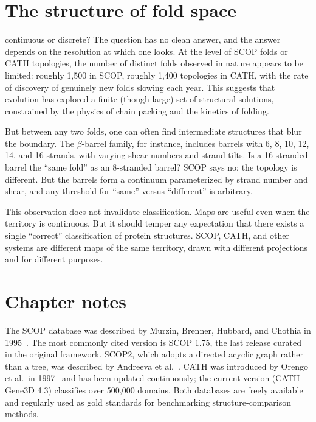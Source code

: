 \section{The structure of fold space}
\label{sec:fold_space}

 continuous or discrete? The question
has no clean answer, and the answer depends on the resolution at which one looks.
At the level of SCOP folds or CATH topologies, the number of distinct folds
observed in nature appears to be limited: roughly 1,500 in SCOP, roughly 1,400
topologies in CATH, with the rate of discovery of genuinely new folds slowing each
year. This suggests that evolution has explored a finite (though large) set of
structural solutions, constrained by the physics of chain packing and the
kinetics of folding.

But between any two folds, one can often find intermediate structures that blur
the boundary. The $\beta$-barrel family, for instance, includes barrels with 6, 8,
10, 12, 14, and 16 strands, with varying shear numbers and strand tilts. Is a
16-stranded barrel the ``same fold'' as an 8-stranded barrel? SCOP says no; the
topology is different. But the barrels form a continuum parameterized by strand
number and shear, and any threshold for ``same'' versus ``different'' is
arbitrary.

This observation does not invalidate classification. Maps are useful even when
the territory is continuous. But it should temper any expectation that there
exists a single ``correct'' classification of protein structures. SCOP, CATH, and
other systems are different maps of the same territory, drawn with different
projections and for different purposes.


\section{Chapter notes}
\label{sec:ch5_notes}

The SCOP database was described by Murzin, Brenner, Hubbard, and Chothia in 1995~\cite{murzin1995}.
The most commonly cited version is SCOP 1.75, the last release curated in the
original framework. SCOP2, which adopts a directed acyclic graph rather than a
tree, was described by Andreeva et al.\ \cite{andreeva2014}. CATH was introduced by Orengo et al.\ in
1997~\cite{orengo1997} and has been updated continuously; the current version
(CATH-Gene3D 4.3) classifies over 500,000 domains. Both databases are freely
available and regularly used as gold standards for benchmarking structure-comparison
methods.

